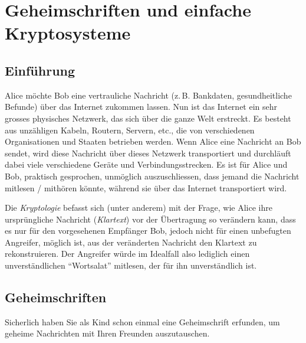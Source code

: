 \chapter{Geheimschriften und einfache Kryptosysteme}\label{ch:Geheimschriften_Kryptosysteme}

\section{Einführung}\label{sec:intro}

Alice möchte Bob eine vertrauliche Nachricht (z.\,B. Bankdaten, gesundheitliche Befunde) über das Internet zukommen lassen. Nun ist das Internet ein sehr grosses physisches Netzwerk, das sich über die ganze Welt erstreckt.
Es besteht aus unzähligen Kabeln, Routern, Servern, etc., die von verschiedenen Organisationen und Staaten betrieben werden. Wenn Alice eine Nachricht an Bob sendet, wird diese Nachricht über dieses Netzwerk transportiert und durchläuft dabei viele verschiedene Geräte und Verbindungsstrecken.
Es ist für Alice und Bob, praktisch gesprochen, unmöglich auszuschliessen, dass jemand die Nachricht mitlesen / mithören könnte, während sie über das Internet transportiert wird.
\par

Die \emph{Kryptologie} befasst sich (unter anderem) mit der Frage, wie Alice ihre ursprüngliche Nachricht (\emph{Klartext}) vor der Übertragung so verändern kann, dass es nur für den vorgesehenen Empfänger Bob, jedoch nicht für einen unbefugten Angreifer, möglich ist, aus der veränderten Nachricht den Klartext zu rekonstruieren. Der Angreifer würde im Idealfall also lediglich einen unverständlichen \enquote{Wortsalat} mitlesen, der für ihn unverständlich ist.

\section{Geheimschriften}\label{sec:geheimschriften}
Sicherlich haben Sie als Kind schon einmal eine Geheimschrift erfunden, um geheime Nachrichten mit Ihren Freunden auszutauschen.

